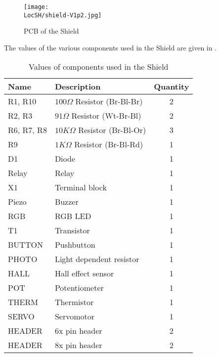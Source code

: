 \begin{figure}
  \centering
  \texttt{[image: \\LocSH/shield-V1p2.jpg]}
  \caption{PCB of the Shield}
  \label{fig:shield-photo}
\end{figure}
The values of the various components used in the Shield are given in
.
\begin{table}
  \centering
  \caption{Values of components used in the Shield}
  \label{tab:shield-values}
  \begin{tabular}{llc} \hline
    Name       & Description                     & Quantity \\ \hline
    R1, R10    & $100\Omega$ Resistor (Br-Bl-Br) & 2        \\
    R2, R3     & $91\Omega$ Resistor (Wt-Br-Bl)  & 2        \\
    R6, R7, R8 & $10K\Omega$ Resistor (Br-Bl-Or) & 3        \\
    R9         & $1K\Omega$ Resistor (Br-Bl-Rd)  & 1        \\
    D1         & Diode                           & 1        \\
    Relay      & Relay                           & 1        \\
    X1         & Terminal block                  & 1        \\
    Piezo      & Buzzer                          & 1        \\
    RGB        & RGB LED                         & 1        \\
    T1         & Transistor                      & 1        \\
    BUTTON     & Pushbutton                      & 1        \\
    PHOTO      & Light dependent resistor        & 1        \\
    HALL       & Hall effect sensor              & 1        \\
    POT        & Potentiometer                   & 1        \\
    THERM      & Thermistor                      & 1        \\
    SERVO      & Servomotor                      & 1        \\
    HEADER     & 6x pin header                   & 2        \\
    HEADER     & 8x pin header                   & 2        \\
    \hline
  \end{tabular}
\end{table}

